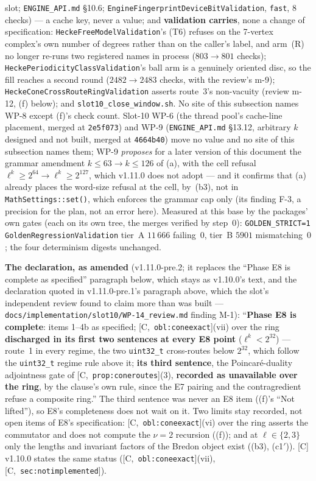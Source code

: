 \documentclass[11pt]{article}
\theoremstyle{remark}
\newcommand{\HA}[1]{[C,~\texttt{#1}]}      %
\begin{document}
slot; \texttt{ENGINE\_API.md} \S10.6; \texttt{EngineFingerprintDeviceBitValidation}, \texttt{fast},
$8$ checks) --- a cache key, never a value; and \textbf{validation carries}, none a change of
specification: \texttt{HeckeFreeModelValidation}'s (T6) refuses on the 7-vertex complex's own number
of degrees rather than on the caller's label, and arm~(R) no longer re-runs two registered names
in process ($803\to801$ checks); \texttt{HeckePeriodicityClassValidation}'s ball arm is a genuinely
oriented disc, so the fill reaches a second round ($2482\to2483$ checks, with the review's m-9);
\texttt{HeckeConeCrossRouteRingValidation} asserts route~3's non-vacuity (review m-12, (f) below);
and \texttt{slot10\_close\_window.sh}. No site of this subsection names WP-8 except (f)'s check
count. Slot-10 WP-6 (the thread pool's cache-line placement,
merged at \texttt{2e5f073}) and WP-9 (\texttt{ENGINE\_API.md} \S13.12, arbitrary $k$ designed and
not built, merged at \texttt{4664b40}) move no value and no site of this subsection names them; WP-9
\emph{proposes} for a later version of this document the grammar amendment $k\le63\to k\le126$ of
(a), with the cell refusal $\ell^k\ge2^{64}\to\ell^k\ge2^{127}$, which v1.11.0 does not adopt ---
and it confirms that (a) already places the word-size refusal at the cell, by~(b3), not in
\texttt{MathSettings::set()}, which enforces the grammar cap only (its finding F-3, a precision for
the plan, not an error here). Measured at this base by the packages' own gates (each on its own
tree, the merges verified by step~0): \texttt{GOLDEN\_STRICT=1 GoldenRegressionValidation} tier~A
$11\,666$ failing~$0$, tier~B $5901$ mismatching~$0$; the four determinism digests unchanged.

\textbf{The declaration, as amended} (v1.11.0-pre.2; it replaces the ``Phase E8 is complete as
specified'' paragraph below, which stays as v1.10.0's text, and the declaration quoted in
v1.11.0-pre.1's paragraph above, which the slot's independent review found to claim more than was
built --- \texttt{docs/implementation/slot10/WP-14\_review.md} finding M-1): ``\textbf{Phase E8 is
complete}: items 1--4b as specified; \HA{obl:coneexact}(vii) over the ring \textbf{discharged in its
first two sentences at every E8 point} ($\ell^k<2^{32}$) --- route~1 in every regime, the two
\texttt{uint32\_t} cross-routes below $2^{32}$, which follow the \texttt{uint32\_t} regime rule
above it; \textbf{its third sentence}, the Poincar\'e-duality adjointness gate of
\HA{prop:coneroutes}(3), \textbf{recorded as unavailable over the ring}, by the clause's own rule,
since the E7 pairing and the contragredient refuse a composite ring.'' The third sentence was never
an E8 item ((f)'s ``Not lifted''), so E8's completeness does not wait on it. Two limits stay
recorded, not open items of E8's specification: \HA{obl:coneexact}(vi) over the ring asserts the
commutator and does not compute the $\nu=2$ recursion ((f)); and at $\ell\in\{2,3\}$ only the
lengths and invariant factors of the Bredon object exist ((b3), (c1$'$)). [C] v1.10.0 states the
same status (\HA{obl:coneexact}(vii), \HA{sec:notimplemented}).
\end{document}
